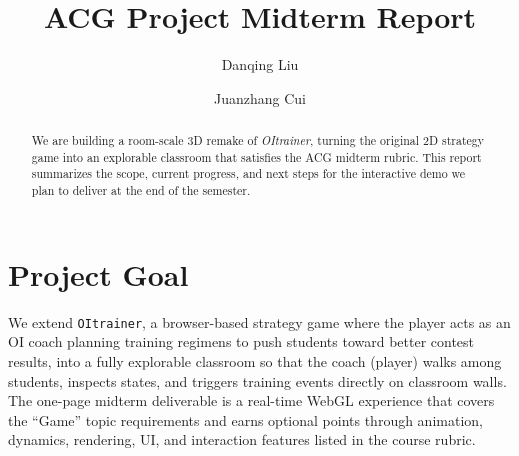 \documentclass[sigconf]{acmart}
\begin{document}
\title{ACG Project Midterm Report}

\author{Danqing Liu}

\author{Juanzhang Cui}
\authornotemark[1]


\begin{abstract}
We are building a room-scale 3D remake of \textit{OItrainer}, turning the
original 2D strategy game into an explorable classroom that satisfies the
ACG midterm rubric. This report summarizes the scope, current progress, and
next steps for the interactive demo we plan to deliver at the end of the
semester.
\end{abstract}

\maketitle

\section{Project Goal}

We extend \texttt{OItrainer}, a browser-based strategy game where the player
acts as an OI coach planning training regimens to push students toward better
contest results, into a fully explorable classroom so that the coach (player)
walks among students, inspects states, and triggers training events directly on
classroom walls. The one-page midterm deliverable is a real-time WebGL
experience that covers the ``Game'' topic requirements and earns optional
points through animation, dynamics, rendering, UI, and interaction features
listed in the course rubric.
\end{document}

